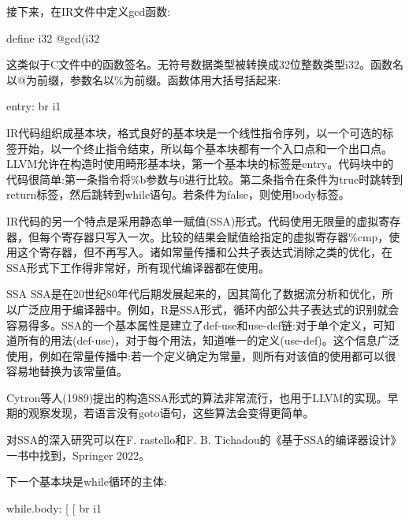 接下来，在IR文件中定义gcd函数:

\begin{shell}
define i32 @gcd(i32 %
\end{shell}

这类似于C文件中的函数签名。无符号数据类型被转换成32位整数类型i32。函数名以@为前缀，参数名以\%为前缀。函数体用大括号括起来:

\begin{shell}
entry:
    br i1 %
\end{shell}

IR代码组织成基本块，格式良好的基本块是一个线性指令序列，以一个可选的标签开始，以一个终止指令结束，所以每个基本块都有一个入口点和一个出口点。LLVM允许在构造时使用畸形基本块，第一个基本块的标签是entry。代码块中的代码很简单:第一条指令将\%b参数与0进行比较。第二条指令在条件为true时跳转到return标签，然后跳转到while语句。若条件为false，则使用body标签。

IR代码的另一个特点是采用静态单一赋值(SSA)形式。代码使用无限量的虚拟寄存器，但每个寄存器只写入一次。比较的结果会赋值给指定的虚拟寄存器\%cmp，使用这个寄存器，但不再写入。诸如常量传播和公共子表达式消除之类的优化，在SSA形式下工作得非常好，所有现代编译器都在使用。

\begin{myTip}{SSA}
SSA是在20世纪80年代后期发展起来的，因其简化了数据流分析和优化，所以广泛应用于编译器中。例如，R是SSA形式，循环内部公共子表达式的识别就会容易得多。SSA的一个基本属性是建立了def-use和use-def链:对于单个定义，可知道所有的用法(def-use)，对于每个用法，知道唯一的定义(use-def)。这个信息广泛使用，例如在常量传播中:若一个定义确定为常量，则所有对该值的使用都可以很容易地替换为该常量值。

Cytron等人(1989)提出的构造SSA形式的算法非常流行，也用于LLVM的实现。早期的观察发现，若语言没有goto语句，这些算法会变得更简单。

对SSA的深入研究可以在F. rastello和F. B. Tichadou的《基于SSA的编译器设计》一书中找到，Springer 2022。
\end{myTip}

下一个基本块是while循环的主体:

\begin{shell}
while.body:
                        [ %
                        [ %
    br i1 %
\end{shell}

